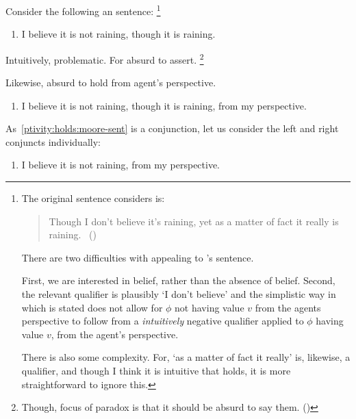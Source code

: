 \begin{note}
  Consider the following \citeauthor{Moore:1993wk}an sentence:%
  \footnote{
    The original sentence \citeauthor{Moore:1993wk} considers is:

    \begin{quote}
      Though I don't believe it's raining, yet as a matter of fact it really is raining.%
      \mbox{ }\hfill\mbox{(\citeyear[207]{Moore:1993wk})}
    \end{quote}
    There are two difficulties with appealing to \citeauthor{Moore:1993wk}'s sentence.

    First, we are interested in belief, rather than the absence of belief.
    Second, the relevant qualifier is plausibly `I don't believe' and the simplistic way in which \ptivity{} is stated does not allow for \(\phi\) not having value \(v\) from the agents perspective to follow from a \emph{intuitively} negative qualifier applied to \(\phi\) having value \(v\), from the agent's perspective.

    There is also some complexity.
    For, `as a matter of fact it really' is, likewise, a qualifier, and though I think it is intuitive that \ptivity{} holds, it is more straightforward to ignore this.
  }

  \begin{enumerate}[label=\emph{M}., ref=(\emph{M})]
  \item
    \label{ptivity:holds:moore-sent}
    I believe it is not raining, though it is raining.
  \end{enumerate}

  Intuitively, problematic.
  For \citeauthor{Moore:1993wk} absurd to assert.%
  \footnote{
    Though, focus of paradox is that it should be absurd to say them.
    (\citeyear[Cf.][208]{Moore:1993wk})
  }

  Likewise, absurd to hold from agent's perspective.

  \begin{enumerate}[label=\emph{M\('\)}., ref=(\emph{M\('\)})]
  \item
    \label{ptivity:holds:moore-sent:pers}
    I believe it is not raining, though it is raining, from my perspective.
  \end{enumerate}


  As~\ref{ptivity:holds:moore-sent} is a conjunction, let us consider the left and right conjuncts individually:

  \begin{enumerate}[label=\emph{M\('\)\textsubscript{l}}., ref=(\emph{M\('\)\textsubscript{l}})]
  \item
    \label{ptivity:holds:moore-sent:pers:l}
    I believe it is not raining, from my perspective.
  \end{enumerate}


\end{note}
